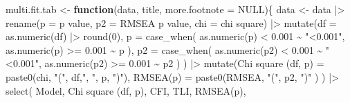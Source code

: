 \documentclass[
]{article}
\newenvironment{Shaded}{\begin{snugshade}}{\end{snugshade}}
\newcommand{\AttributeTok}[1]{\textcolor[rgb]{0.77,0.63,0.00}{#1}}
\newcommand{\ConstantTok}[1]{\textcolor[rgb]{0.00,0.00,0.00}{#1}}
\newcommand{\ControlFlowTok}[1]{\textcolor[rgb]{0.13,0.29,0.53}{\textbf{#1}}}
\newcommand{\DecValTok}[1]{\textcolor[rgb]{0.00,0.00,0.81}{#1}}
\newcommand{\FloatTok}[1]{\textcolor[rgb]{0.00,0.00,0.81}{#1}}
\newcommand{\FunctionTok}[1]{\textcolor[rgb]{0.00,0.00,0.00}{#1}}
\newcommand{\NormalTok}[1]{#1}
\newcommand{\OtherTok}[1]{\textcolor[rgb]{0.56,0.35,0.01}{#1}}
\newcommand{\SpecialCharTok}[1]{\textcolor[rgb]{0.00,0.00,0.00}{#1}}
\newcommand{\StringTok}[1]{\textcolor[rgb]{0.31,0.60,0.02}{#1}}
\begin{document}
\begin{Shaded}
\begin{Highlighting}[]
\NormalTok{multi.fit.tab }\OtherTok{\textless{}{-}} \ControlFlowTok{function}\NormalTok{(data, title, }\AttributeTok{more.footnote =} \ConstantTok{NULL}\NormalTok{)\{}
\NormalTok{data }\OtherTok{\textless{}{-}}\NormalTok{ data }\SpecialCharTok{|\textgreater{}} 
  \FunctionTok{rename}\NormalTok{(}\AttributeTok{p =} \StringTok{\textquotesingle{}p value\textquotesingle{}}\NormalTok{,}
         \AttributeTok{p2 =} \StringTok{\textquotesingle{}RMSEA p value\textquotesingle{}}\NormalTok{,}
         \AttributeTok{chi =} \StringTok{\textquotesingle{}chi square\textquotesingle{}}\NormalTok{) }\SpecialCharTok{|\textgreater{}} 
  \FunctionTok{mutate}\NormalTok{(}\AttributeTok{df =} \FunctionTok{as.numeric}\NormalTok{(df) }\SpecialCharTok{|\textgreater{}} \FunctionTok{round}\NormalTok{(}\DecValTok{0}\NormalTok{),}
         \AttributeTok{p =} \FunctionTok{case\_when}\NormalTok{(}
           \FunctionTok{as.numeric}\NormalTok{(p) }\SpecialCharTok{\textless{}} \FloatTok{0.001} \SpecialCharTok{\textasciitilde{}} \StringTok{"\textless{}0.001"}\NormalTok{,}
           \FunctionTok{as.numeric}\NormalTok{(p) }\SpecialCharTok{\textgreater{}=} \FloatTok{0.001} \SpecialCharTok{\textasciitilde{}}\NormalTok{ p}
\NormalTok{           ),}
         \AttributeTok{p2 =} \FunctionTok{case\_when}\NormalTok{(}
           \FunctionTok{as.numeric}\NormalTok{(p2) }\SpecialCharTok{\textless{}} \FloatTok{0.001} \SpecialCharTok{\textasciitilde{}} \StringTok{"\textless{}0.001"}\NormalTok{,}
           \FunctionTok{as.numeric}\NormalTok{(p2) }\SpecialCharTok{\textgreater{}=} \FloatTok{0.001} \SpecialCharTok{\textasciitilde{}}\NormalTok{ p2}
\NormalTok{           )}
\NormalTok{         ) }\SpecialCharTok{|\textgreater{}}
  \FunctionTok{mutate}\NormalTok{(}\StringTok{\textquotesingle{}Chi square (df, p)\textquotesingle{}} \OtherTok{=} 
           \FunctionTok{paste0}\NormalTok{(chi, }\StringTok{"("}\NormalTok{, df,}\StringTok{", "}\NormalTok{, p, }\StringTok{")"}\NormalTok{),}
         \StringTok{\textquotesingle{}RMSEA(p)\textquotesingle{}}           \OtherTok{=} 
           \FunctionTok{paste0}\NormalTok{(RMSEA, }\StringTok{"("}\NormalTok{, p2, }\StringTok{")"}
\NormalTok{                  )}
\NormalTok{         ) }\SpecialCharTok{|\textgreater{}} 
  \FunctionTok{select}\NormalTok{(}
\NormalTok{    Model,}
    \StringTok{\textquotesingle{}Chi square (df, p)\textquotesingle{}}\NormalTok{, }
\NormalTok{    CFI, TLI,}
    \StringTok{\textquotesingle{}RMSEA(p)\textquotesingle{}}\NormalTok{, }

\end{Highlighting}
\end{Shaded}
\end{document}

